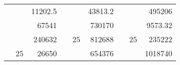 \begin{table}[H]
\begin{tabular}{|ccrccrccc}
\rowcolor[HTML]{DAE8FC} 
\multicolumn{1}{|c|}{\cellcolor[HTML]{FFFFC7}}                                & \multicolumn{1}{c|}{\cellcolor[HTML]{DAE8FC}}                      & \multicolumn{1}{r|}{\cellcolor[HTML]{DAE8FC}11202.5}   & \multicolumn{1}{c|}{\cellcolor[HTML]{FFFFC7}}                                & \multicolumn{1}{c|}{\cellcolor[HTML]{DAE8FC}}                       & \multicolumn{1}{r|}{\cellcolor[HTML]{DAE8FC}43813.2}   & \multicolumn{1}{c|}{\cellcolor[HTML]{FFFFC7}}                                & \multicolumn{1}{c|}{\cellcolor[HTML]{DAE8FC}}                      & \multicolumn{1}{r|}{\cellcolor[HTML]{DAE8FC}495206}    \\ \cline{3-3} \cline{6-6} \cline{9-9} 
\multicolumn{1}{|c|}{\cellcolor[HTML]{FFFFC7}}                                & \multicolumn{1}{c|}{\cellcolor[HTML]{DAE8FC}}                      & \multicolumn{1}{r|}{\cellcolor[HTML]{DDFDFF}67541}     & \multicolumn{1}{c|}{\cellcolor[HTML]{FFFFC7}}                                & \multicolumn{1}{c|}{\cellcolor[HTML]{DAE8FC}}                       & \multicolumn{1}{r|}{\cellcolor[HTML]{DDFDFF}730170}    & \multicolumn{1}{c|}{\cellcolor[HTML]{FFFFC7}}                                & \multicolumn{1}{c|}{\cellcolor[HTML]{DAE8FC}}                      & \multicolumn{1}{r|}{\cellcolor[HTML]{DDFDFF}9573.32}   \\ \cline{3-3} \cline{6-6} \cline{9-9} 
\rowcolor[HTML]{DAE8FC} 
\multicolumn{1}{|c|}{\cellcolor[HTML]{FFFFC7}}                                & \multicolumn{1}{c|}{\cellcolor[HTML]{DAE8FC}}                      & \multicolumn{1}{r|}{\cellcolor[HTML]{DAE8FC}240632}    & \multicolumn{1}{c|}{\cellcolor[HTML]{FFFFC7}}                                & \multicolumn{1}{c|}{\multirow{-9}{*}{\cellcolor[HTML]{DAE8FC}25}}   & \multicolumn{1}{r|}{\cellcolor[HTML]{DAE8FC}812688}    & \multicolumn{1}{c|}{\cellcolor[HTML]{FFFFC7}}                                & \multicolumn{1}{c|}{\multirow{-9}{*}{\cellcolor[HTML]{DAE8FC}25}}  & \multicolumn{1}{r|}{\cellcolor[HTML]{DAE8FC}235222}    \\ \cline{3-3} \cline{5-6} \cline{8-9} 
\multicolumn{1}{|c|}{\cellcolor[HTML]{FFFFC7}}                                & \multicolumn{1}{c|}{\multirow{-10}{*}{\cellcolor[HTML]{DAE8FC}25}} & \multicolumn{1}{r|}{\cellcolor[HTML]{DDFDFF}26650}     & \multicolumn{1}{c|}{\cellcolor[HTML]{FFFFC7}}                                & \multicolumn{1}{c|}{\cellcolor[HTML]{DDFDFF}}                       & \multicolumn{1}{r|}{\cellcolor[HTML]{DAE8FC}654376}    & \multicolumn{1}{c|}{\cellcolor[HTML]{FFFFC7}}                                & \multicolumn{1}{c|}{\cellcolor[HTML]{DDFDFF}}                      & \multicolumn{1}{r|}{\cellcolor[HTML]{DAE8FC}1018740}   \\ \cline{2-3} \cline{6-6} \cline{9-9} 

\end{tabular}
\end{table}
